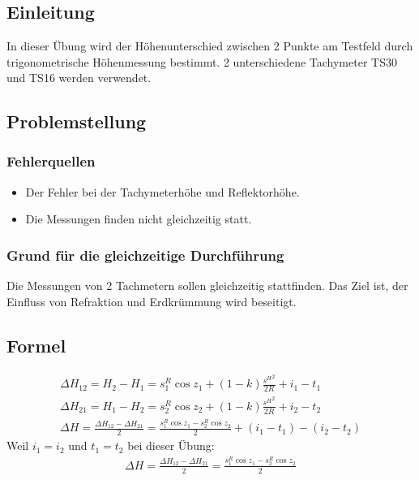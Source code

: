 \newpage
\chapter{}
\section{Einleitung}
In dieser Übung wird der Höhenunterschied zwischen 2 Punkte am Testfeld durch trigonometrische Höhenmessung bestimmt. 2 unterschiedene Tachymeter TS30 und TS16 werden verwendet.
\section{Problemstellung}
\subsection{Fehlerquellen}
\begin{itemize}
	\item Der Fehler bei der Tachymeterhöhe und Reflektorhöhe.
	\item Die Messungen finden nicht gleichzeitig statt.
\end{itemize}
\subsection{Grund für die gleichzeitige Durchführung}
Die Messungen von 2 Tachmetern sollen gleichzeitig stattfinden. Das Ziel ist, der Einfluss von Refraktion und Erdkrümmung wird beseitigt.

\section{Formel}
\begin{gather*}
	\Delta H_{12} = H_2 - H_1 = s^R_1 \cos z_1 + (1 - k) \frac{{s^H}^2}{2R} + i_1 - t_1\\
	\Delta H_{21} = H_1 - H_2 = s^R_2 \cos z_2 + (1 - k) \frac{{s^H}^2}{2R} + i_2 - t_2\\
	\Delta H = \frac{\Delta H_{12} - \Delta H_{21}}{2} = \frac{s^R_1 \cos z_1 - s^R_2 \cos z_2}{2} + (i_1 - t_1) - (i_2 - t_2)
\end{gather*}
Weil $i_1 = i_2$ und $t_1 = t_2$ bei dieser Übung:
\begin{gather*}
	\Delta H = \frac{\Delta H_{12} - \Delta H_{21}}{2} = \frac{s^R_1 \cos z_1 - s^R_2 \cos z_2}{2}
\end{gather*}
